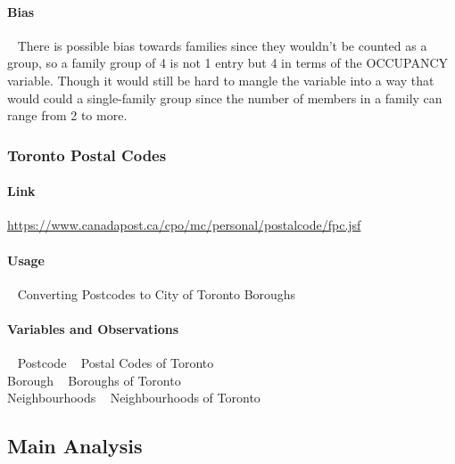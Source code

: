 \documentclass[
]{article}
\begin{document}
\hypertarget{bias-1}{%
\paragraph{Bias}\label{bias-1}}

~ There is possible bias towards families since they wouldn't be counted
as a group, so a family group of 4 is not 1 entry but 4 in terms of the
OCCUPANCY variable. Though it would still be hard to mangle the variable
into a way that would could a single-family group since the number of
members in a family can range from 2 to more.

\hypertarget{toronto-postal-codes}{%
\subsubsection{Toronto Postal Codes}\label{toronto-postal-codes}}

\hypertarget{link-1}{%
\paragraph{Link}\label{link-1}}

\url{https://www.canadapost.ca/cpo/mc/personal/postalcode/fpc.jsf}

\hypertarget{usage-2}{%
\paragraph{Usage}\label{usage-2}}

~ Converting Postcodes to City of Toronto Boroughs

\hypertarget{variables-and-observations-2}{%
\paragraph{Variables and
Observations}\label{variables-and-observations-2}}

~ Postcode ~ Postal Codes of Toronto\\
\hspace*{0.333em} Borough ~ Boroughs of Toronto\\
\hspace*{0.333em} Neighbourhoods ~ Neighbourhoods of Toronto

\hypertarget{main-analysis}{%
\subsection{Main Analysis}\label{main-analysis}}
\end{document}
